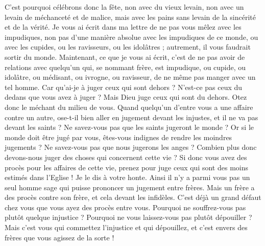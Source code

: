 \begin{multicols}{2}
C'est pourquoi célébrons donc la fête, non avec du vieux levain, non avec un levain de méchanceté et de malice, mais avec les pains sans levain de la sincérité et de la vérité.
Je vous ai écrit dans ma lettre de ne pas vous mêlez avec les impudiques,
non pas d’une manière absolue avec les impudiques de ce monde, ou avec les cupides, ou les ravisseurs, ou les idolâtres ; autrement, il vous faudrait sortir du monde.
Maintenant, ce que je vous ai écrit, c’est de ne pas avoir de relations avec quelqu’un qui, se nommant frère, est impudique, ou cupide, ou idolâtre, ou médisant, ou ivrogne, ou ravisseur, de ne même pas manger avec un tel homme.
Car qu'ai-je à juger ceux qui sont dehors ? N’est-ce pas ceux du dedans que vous avez à juger ?
Mais Dieu juge ceux qui sont du dehors. Otez donc le méchant du milieu de vous.
\VerseOne{}Quand quelqu'un d'entre vous a une affaire contre un autre, ose-t-il bien aller en jugement devant les injustes, et il ne va pas devant les saints ?
Ne savez-vous pas que les saints jugeront le monde ? Or si le monde doit être jugé par vous, êtes-vous indignes de rendre les moindres jugements ?
Ne savez-vous pas que nous jugerons les anges ? Combien plus donc devons-nous juger des choses qui concernent cette vie ?
Si donc vous avez des procès pour les affaires de cette vie, prenez pour juge ceux qui sont des moins estimés dans l'Eglise !
Je le dis à votre honte. Ainsi il n’y a parmi vous pas un seul homme sage qui puisse prononcer un jugement entre frères.
Mais un frère a des procès contre son frère, et cela devant les infidèles.
C'est déjà un grand défaut chez vous que vous ayez des procès entre vous. Pourquoi ne souffrez-vous pas plutôt quelque injustice ? Pourquoi ne vous laissez-vous pas plutôt dépouiller ?
Mais c’est vous qui commettez l’injustice et qui dépouillez, et c’est envers des frères que vous agissez de la sorte !

\end{multicols}
